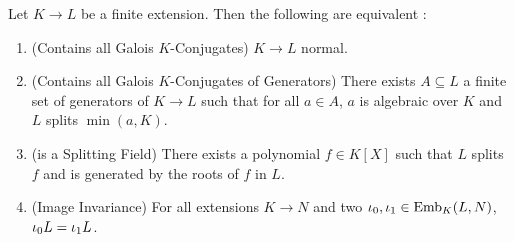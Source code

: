 \documentclass{article}
\begin{document}
\begin{prop} 
  
  Let $K \to L$ be a finite extension.
  Then the following are equivalent : 
  \begin{enumerate}
    \item (Contains all Galois $K$-Conjugates) $K \to L$ normal. 
    \item (Contains all Galois $K$-Conjugates of Generators) 
    There exists $A \subseteq L$ a finite set of generators of $K \to L$
    such that for all $a \in A$, 
    $a$ is algebraic over $K$ and $L$ splits $\min(a,K)$. 
    \item (is a Splitting Field) 
    There exists a polynomial $f \in K[X]$ such that
    $L$ splits $f$ and is generated by the roots of $f$ in $L$.
    \item (Image Invariance) For all extensions $K \to N$
    and two $\iota_0, \iota_1 \in \mathrm{Emb}_{K}(L, N)$, 
    $\iota_0 L = \iota_1 L$.
  \end{enumerate}
\end{prop}
\end{document}
